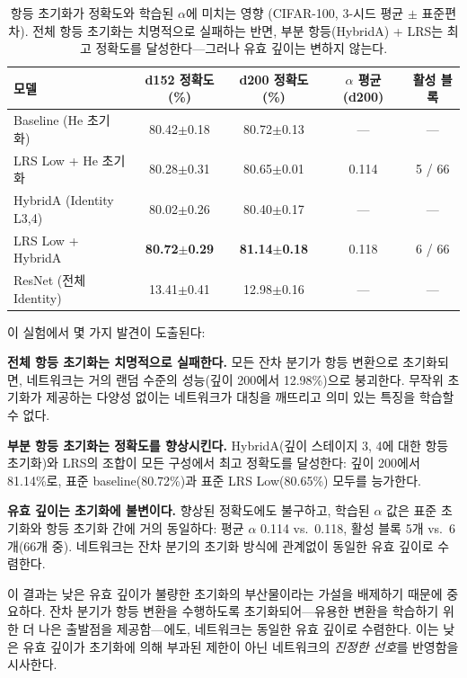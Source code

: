 \documentclass[preprint,12pt]{elsarticle}
\begin{document}
\begin{table}[t]
\centering
\caption{항등 초기화가 정확도와 학습된 $\alpha$에 미치는 영향 (CIFAR-100, 3-시드 평균 $\pm$ 표준편차). 전체 항등 초기화는 치명적으로 실패하는 반면, 부분 항등(HybridA) + LRS는 최고 정확도를 달성한다---그러나 유효 깊이는 변하지 않는다.}
\label{tab:identity_init}
\begin{tabular}{lcccc}
\toprule
\textbf{모델} & \textbf{d152 정확도 (\%)} & \textbf{d200 정확도 (\%)} & \textbf{$\alpha$ 평균 (d200)} & \textbf{활성 블록} \\
\midrule
Baseline (He 초기화) & 80.42$\pm$0.18 & 80.72$\pm$0.13 & --- & --- \\
LRS Low + He 초기화 & 80.28$\pm$0.31 & 80.65$\pm$0.01 & 0.114 & 5 / 66 \\
HybridA (Identity L3,4) & 80.02$\pm$0.26 & 80.40$\pm$0.17 & --- & --- \\
LRS Low + HybridA & \textbf{80.72$\pm$0.29} & \textbf{81.14$\pm$0.18} & 0.118 & 6 / 66 \\
ResNet (전체 Identity) & 13.41$\pm$0.41 & 12.98$\pm$0.16 & --- & --- \\
\bottomrule
\end{tabular}
\end{table}

이 실험에서 몇 가지 발견이 도출된다:

\textbf{전체 항등 초기화는 치명적으로 실패한다.} 모든 잔차 분기가 항등 변환으로 초기화되면, 네트워크는 거의 랜덤 수준의 성능(깊이 200에서 12.98\%)으로 붕괴한다. 무작위 초기화가 제공하는 다양성 없이는 네트워크가 대칭을 깨뜨리고 의미 있는 특징을 학습할 수 없다.

\textbf{부분 항등 초기화는 정확도를 향상시킨다.} HybridA(깊이 스테이지 3, 4에 대한 항등 초기화)와 LRS의 조합이 모든 구성에서 최고 정확도를 달성한다: 깊이 200에서 81.14\%로, 표준 baseline(80.72\%)과 표준 LRS Low(80.65\%) 모두를 능가한다.

\textbf{유효 깊이는 초기화에 불변이다.} 향상된 정확도에도 불구하고, 학습된 $\alpha$ 값은 표준 초기화와 항등 초기화 간에 거의 동일하다: 평균 $\alpha$ 0.114 vs.\ 0.118, 활성 블록 5개 vs.\ 6개(66개 중). 네트워크는 잔차 분기의 초기화 방식에 관계없이 동일한 유효 깊이로 수렴한다.

이 결과는 낮은 유효 깊이가 불량한 초기화의 부산물이라는 가설을 배제하기 때문에 중요하다. 잔차 분기가 항등 변환을 수행하도록 초기화되어---유용한 변환을 학습하기 위한 더 나은 출발점을 제공함---에도, 네트워크는 동일한 유효 깊이로 수렴한다. 이는 낮은 유효 깊이가 초기화에 의해 부과된 제한이 아닌 네트워크의 \emph{진정한 선호}를 반영함을 시사한다.
\end{document}
